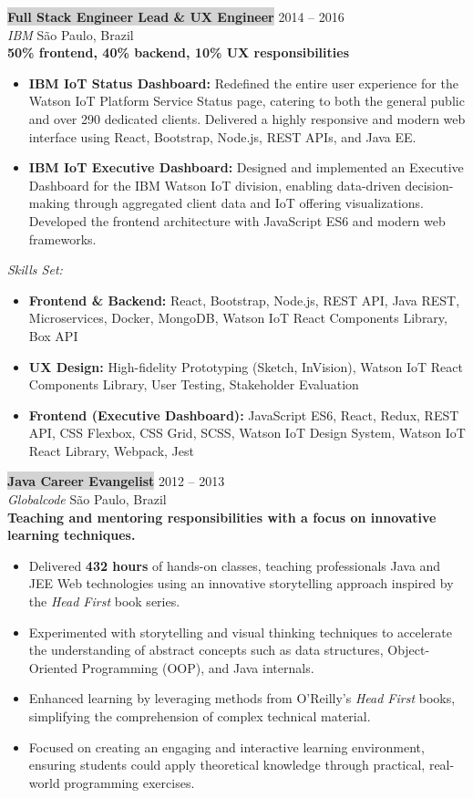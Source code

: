 \documentclass{resume} %
\begin{document}
\hfill \break

\colorbox{lightgray}{\textbf{Full Stack Engineer Lead \& UX Engineer}} \hfill 2014 -- 2016\\
\textit{IBM} \hfill São Paulo, Brazil\\
\textbf{50\% frontend, 40\% backend, 10\% UX responsibilities}
\begin{itemize}
    \item \textbf{IBM IoT Status Dashboard:} Redefined the entire user experience for the Watson IoT Platform Service Status page, catering to both the general public and over 290 dedicated clients. Delivered a highly responsive and modern web interface using React, Bootstrap, Node.js, REST APIs, and Java EE.
    \item \textbf{IBM IoT Executive Dashboard:} Designed and implemented an Executive Dashboard for the IBM Watson IoT division, enabling data-driven decision-making through aggregated client data and IoT offering visualizations. Developed the frontend architecture with JavaScript ES6 and modern web frameworks.
\end{itemize}

\textit{Skills Set:}
\begin{itemize}
    \item \textbf{Frontend \& Backend:} React, Bootstrap, Node.js, REST API, Java REST, Microservices, Docker, MongoDB, Watson IoT React Components Library, Box API
    \item \textbf{UX Design:} High-fidelity Prototyping (Sketch, InVision), Watson IoT React Components Library, User Testing, Stakeholder Evaluation
    \item \textbf{Frontend (Executive Dashboard):} JavaScript ES6, React, Redux, REST API, CSS Flexbox, CSS Grid, SCSS, Watson IoT Design System, Watson IoT React Library, Webpack, Jest
\end{itemize}
\hfill \break

\colorbox{lightgray}{\textbf{Java Career Evangelist}} \hfill 2012 -- 2013\\
\textit{Globalcode} \hfill São Paulo, Brazil\\
\textbf{Teaching and mentoring responsibilities with a focus on innovative learning techniques.}
\begin{itemize}
    \item Delivered \textbf{432 hours} of hands-on classes, teaching professionals Java and JEE Web technologies using an innovative storytelling approach inspired by the \textit{Head First} book series.
    \item Experimented with storytelling and visual thinking techniques to accelerate the understanding of abstract concepts such as data structures, Object-Oriented Programming (OOP), and Java internals.
    \item Enhanced learning by leveraging methods from O'Reilly's \textit{Head First} books, simplifying the comprehension of complex technical material.
    \item Focused on creating an engaging and interactive learning environment, ensuring students could apply theoretical knowledge through practical, real-world programming exercises.
\end{itemize}
\end{document}
